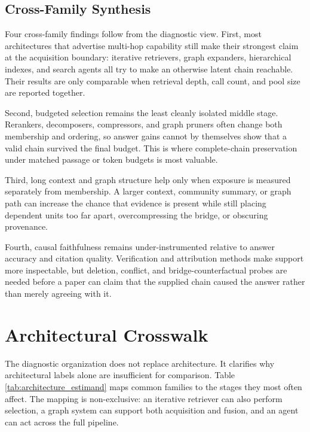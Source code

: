 \documentclass[manuscript,review]{acmart}
\theoremstyle{definition}
\theoremstyle{plain}
\theoremstyle{remark}
\begin{document}
\subsection{Cross-Family Synthesis}
\label{subsec:cross_family_synthesis}

Four cross-family findings follow from the diagnostic view. First, most
architectures that advertise multi-hop capability still make their strongest
claim at the acquisition boundary: iterative retrievers, graph expanders,
hierarchical indexes, and search agents all try to make an otherwise latent
chain reachable. Their results are only comparable when retrieval depth,
call count, and pool size are reported together.

Second, budgeted selection remains the least cleanly isolated middle stage.
Rerankers, decomposers, compressors, and graph pruners often change both
membership and ordering, so answer gains cannot by themselves show that a
valid chain survived the final budget. This is where complete-chain
preservation under matched passage or token budgets is most valuable.

Third, long context and graph structure help only when exposure is measured
separately from membership. A larger context, community summary, or graph
path can increase the chance that evidence is present while still placing
dependent units too far apart, overcompressing the bridge, or obscuring
provenance.

Fourth, causal faithfulness remains under-instrumented relative to answer
accuracy and citation quality. Verification and attribution methods make
support more inspectable, but deletion, conflict, and bridge-counterfactual
probes are needed before a paper can claim that the supplied chain caused the
answer rather than merely agreeing with it.

\section{Architectural Crosswalk}
\label{sec:architecture_view}

The diagnostic organization does not replace architecture. It clarifies why
architectural labels alone are insufficient for comparison. Table
\ref{tab:architecture_estimand} maps common families to the stages they most
often affect. The mapping is non-exclusive: an iterative retriever can also
perform selection, a graph system can support both acquisition and fusion,
and an agent can act across the full pipeline.
\end{document}
